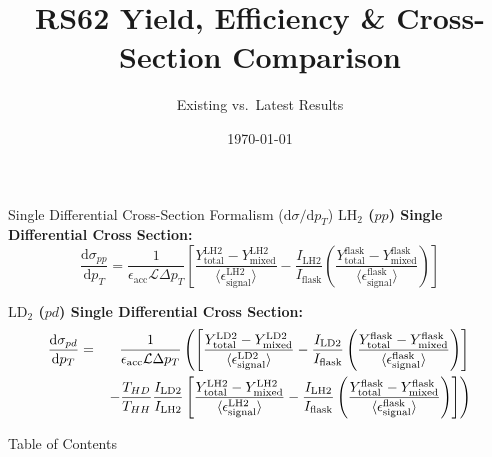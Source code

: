\documentclass[aspectratio=169, 10pt]{beamer}
\title[RS62 XSec Comparison]{RS62 Yield, Efficiency \& Cross-Section Comparison}
\subtitle{Existing vs.\ Latest Results}
\date{\today}
\providecommand{\diffd}{\mathrm{d}}
\begin{document}
\begin{frame}
    \titlepage
\end{frame}

\begin{frame}{Single Differential Cross-Section Formalism ($\diffd\sigma / \diffd p_T$)}
    \textbf{$\text{LH}_2$ ($pp$) Single Differential Cross Section:}
    \begin{equation}
        \frac{\diffd\sigma_{pp}}{\diffd p_{T}} = \frac{1}{\epsilon_{\text{acc}} \mathcal{L} \Delta p_{T}} 
        \left[ 
            \frac{Y^{\text{LH2}}_{\text{total}} - Y^{\text{LH2}}_{\text{mixed}}}{\langle\epsilon^{\text{LH2}}_{\text{signal}}\rangle} 
- \frac{I_{\text{LH2}}}{I_{\text{flask}}} 
            \left( \frac{Y^{\text{flask}}_{\text{total}} - Y^{\text{flask}}_{\text{mixed}}}{\langle\epsilon^{\text{flask}}_{\text{signal}}\rangle} \right)
        \right]
        \label{eq:modified_cross_section_pt}
    \end{equation}

    \vspace{0.3em}
    \textbf{$\text{LD}_2$ ($pd$) Single Differential Cross Section:}
    {\small
    \begin{eqnarray}
        \frac{\diffd\sigma_{pd}}{\diffd p_{T}} &=& \frac{1}{\epsilon_{\text{acc}} \mathcal{L} \Delta p_{T}} 
        \left(
        \left[ 
            \frac{Y^{\text{LD2}}_{\text{total}} - Y^{\text{LD2}}_{\text{mixed}}}{\langle\epsilon^{\text{LD2}}_{\text{signal}}\rangle} 
- \frac{I_{\text{LD2}}}{I_{\text{flask}}} 
            \left( \frac{Y^{\text{flask}}_{\text{total}} - Y^{\text{flask}}_{\text{mixed}}}{\langle\epsilon^{\text{flask}}_{\text{signal}}\rangle} \right)
        \right] \right. \nonumber \\
        & & \left. - \frac{T_{HD}}{T_{HH}} \frac{I_{\rm LD2}}{I_{\rm LH2}}\left[ 
            \frac{Y^{\text{LH2}}_{\text{total}} - Y^{\text{LH2}}_{\text{mixed}}}{\langle\epsilon^{\text{LH2}}_{\text{signal}}\rangle} 
- \frac{I_{\text{LH2}}}{I_{\text{flask}}} 
            \left( \frac{Y^{\text{flask}}_{\text{total}} - Y^{\text{flask}}_{\text{mixed}}}{\langle\epsilon^{\text{flask}}_{\text{signal}}\rangle} \right)
        \right]
        \right)
        \label{eq:modified_cross_section_pd_pt}
    \end{eqnarray}
    }
\end{frame}

\begin{frame}{Table of Contents}
    \tableofcontents
\end{frame}
\end{document}
